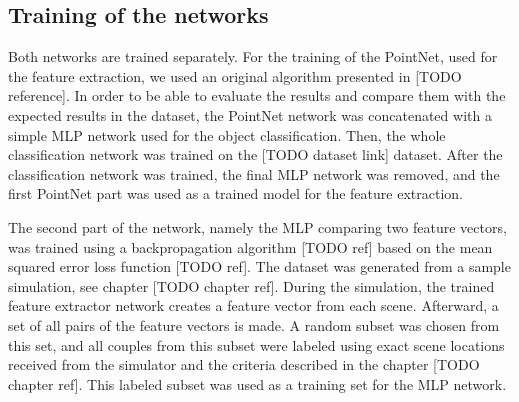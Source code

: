 \subsection{Training of the networks}

Both networks are trained separately. For the training of the PointNet, used for the feature extraction, we used an original algorithm presented in [TODO reference]. In order to be able to evaluate the results and compare them with the expected results in the dataset, the PointNet network was concatenated with a simple MLP network used for the object classification. Then, the whole classification network was trained on the [TODO dataset link] dataset. After the classification network was trained, the final MLP network was removed, and the first PointNet part was used as a trained model for the feature extraction.\par
The second part of the network, namely the MLP comparing two feature vectors, was trained using a backpropagation algorithm [TODO ref] based on the mean squared error loss function [TODO ref]. The dataset was generated from a sample simulation, see chapter [TODO chapter ref]. During the simulation, the trained feature extractor network creates a feature vector from each scene. Afterward, a set of all pairs of the feature vectors is made. A random subset was chosen from this set, and all couples from this subset were labeled using exact scene locations received from the simulator and the criteria described in the chapter [TODO chapter ref]. This labeled subset was used as a training set for the MLP network.
